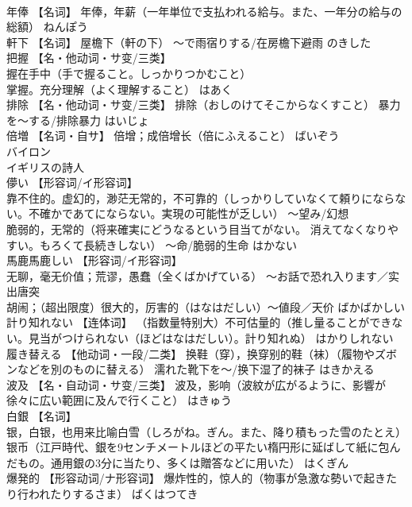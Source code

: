 \documentclass[8pt]{extreport}
\begin{document}
\begin{CJK}{UTF8}{min}
\\	年俸	【名词】 年俸，年薪（一年単位で支払われる給与。また、一年分の給与の総額）	ねんぽう	
\\	軒下	【名词】 屋檐下（軒の下） ～で雨宿りする/在房檐下避雨	のきした	
\\	把握	【名・他动词・サ变/三类】 
\\	握在手中（手で握ること。しっかりつかむこと） 
\\	掌握。充分理解（よく理解すること）	はあく	
\\	排除	【名・他动词・サ变/三类】 排除（おしのけてそこからなくすこと） 暴力を～する/排除暴力	はいじょ	
\\	倍増	【名词・自サ】 倍增；成倍增长（倍にふえること）	ばいぞう	
\\	バイロン	
\\	イギリスの詩人		
\\	儚い	【形容词/イ形容词】 
\\	靠不住的。虚幻的，渺茫无常的，不可靠的（しっかりしていなくて頼りにならない。不確かであてにならない。実現の可能性が乏しい） ～望み/幻想 
\\	脆弱的，无常的（将来確実にどうなるという目当てがない。 消えてなくなりやすい。もろくて長続きしない） ～命/脆弱的生命	はかない	
\\	馬鹿馬鹿しい	【形容词/イ形容词】 
\\	无聊，毫无价值；荒谬，愚蠢（全くばかげている） ～お話で恐れ入ります／实出唐突 
\\	胡闹；（超出限度）很大的，厉害的（はなはだしい）～値段／天价	ばかばかしい	
\\	計り知れない	【连体词】 （指数量特别大）不可估量的（推し量ることができない。見当がつけられない（ほどはなはだしい）。計り知れぬ）	はかりしれない	
\\	履き替える	【他动词・一段/二类】 换鞋（穿），换穿别的鞋（袜）（履物やズボンなどを別のものに替える） 濡れた靴下を～/换下湿了的袜子	はきかえる	
\\	波及	【名・自动词・サ变/三类】 波及，影响（波紋が広がるように、影響が徐々に広い範囲に及んで行くこと）	はきゅう	
\\	白銀	【名词】 
\\	银，白银，也用来比喻白雪（しろがね。ぎん。また、降り積もった雪のたとえ） 
\\	银币（江戸時代、銀を9センチメートルほどの平たい楕円形に延ばして紙に包んだもの。通用銀の3分に当たり、多くは贈答などに用いた）	はくぎん	
\\	爆発的	【形容动词/ナ形容词】 爆炸性的，惊人的（物事が急激な勢いで起きたり行われたりするさま）	ばくはつてき	

\end{CJK}
\end{document}
